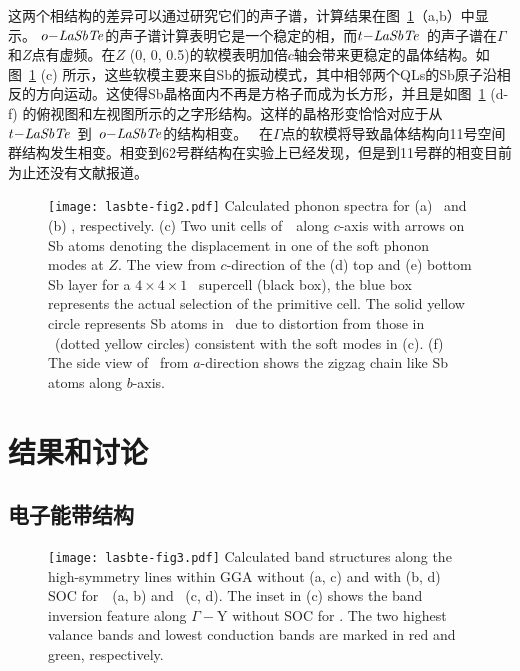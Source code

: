 这两个相结构的差异可以通过研究它们的声子谱，计算结果在图~\ref{phonon}（a,b）中显示。 $o\it{-LaSbTe}$的声子谱计算表明它是一个稳定的相，而$t\it{-LaSbTe}$~的声子谱在$\Gamma$和$Z$点有虚频。在$Z$ (0, 0, 0.5)的软模表明加倍$c$轴会带来更稳定的晶体结构。如图~\ref{phonon} (c) 所示，这些软模主要来自Sb的振动模式，其中相邻两个QLs的Sb原子沿相反的方向运动。这使得Sb晶格面内不再是方格子而成为长方形，并且是如图~\ref{phonon} (d-f) 的俯视图和左视图所示的之字形结构。这样的晶格形变恰恰对应于从~$t\it{-LaSbTe}$~到~$o\it{-LaSbTe}$的结构相变。
\ti~在$\Gamma$点的软模将导致晶体结构向11号空间群结构发生相变。相变到62号群结构在实验上已经发现，但是到11号群的相变目前为止还没有文献报道。
\begin{figure}[!htbp]
    \centering
    \texttt{[image: lasbte-fig2.pdf]}
    {Calculated phonon spectra for (a) \ti~and (b) \tci , respectively. (c) Two unit cells of~\ti~along $c$-axis with arrows on Sb atoms denoting the displacement in one of the soft phonon modes at $Z$. The view from $c$-direction of the (d) top and (e) bottom Sb layer for a $4 \times 4 \times 1$ \tci~supercell (black box), the blue box represents the actual selection of the primitive cell. The solid yellow circle represents Sb atoms in \tci~due to distortion from those in \ti~(dotted yellow circles) consistent with the soft modes in (c). (f) The side view of \tci~from $a$-direction shows the zigzag chain like Sb atoms along $b$-axis. ~\citep{qian2020layer}}
    \label{phonon}
\end{figure}
\section{结果和讨论}
\subsection{电子能带结构}
\begin{figure}[!htb]
    \texttt{[image: lasbte-fig3.pdf]}
    {
        Calculated band structures along the high-symmetry lines within GGA without (a, c) and with (b, d) SOC for~\ti~(a, b) and \tci~(c, d). The inset in (c) shows the band inversion feature along $\Gamma-$Y without SOC for \tci. The two highest valance bands and lowest conduction bands are marked in red and green, respectively. ~\citep{qian2020layer}
    }
    \label{fig:3-2}
\end{figure}

